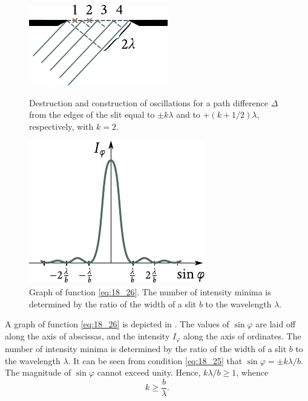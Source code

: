 \begin{figure}[!htb]
	\begin{minipage}[t]{0.48\linewidth}
		\begin{center}
			\includegraphics[scale=1]{figures/ch_18/fig_18_27.pdf}
            \caption[]{Destruction and construction of oscillations for a path difference $\Delta$ from the edges of the slit equal to $\pm k\lambda$ and to $+(k+1/2)\lambda$, respectively, with $k=2$.}
			\label{fig:18_27}
		\end{center}
	\end{minipage}
	\hfill{ }%
	\begin{minipage}[t]{0.48\linewidth}
		\begin{center}
			\includegraphics[scale=1]{figures/ch_18/fig_18_28.pdf}
			\caption[]{Graph of function \eqref{eq:18_26}. The number of intensity minima is determined by the ratio of the width of a slit $b$ to the wavelength $\lambda$.}
			\label{fig:18_28}
		\end{center}
	\end{minipage}
\vspace{-0.4cm}
\end{figure}

A graph of function \eqref{eq:18_26} is depicted in .
The values of $\sin\varphi$ are laid off along the axis of abscissas, and the intensity $I_{\varphi}$
along the axis of ordinates.
The number of intensity minima is determined by the ratio of the width of a slit $b$ to the wavelength $\lambda$.
It can be seen from condition \eqref{eq:18_25} that $\sin\varphi=\pm k\lambda/b$.
The magnitude of $\sin\varphi$ cannot exceed unity.
Hence, $k\lambda/b\geqslant 1$, whence
\begin{equation}\label{eq:18_27}
	k \geqslant \frac{b}{\lambda}.
\end{equation}

